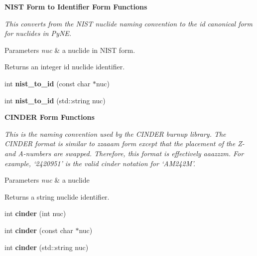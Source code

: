 \begin{Indent}{\bf N\+I\+ST Form to Identifier Form Functions}\par
{\em This converts from the N\+I\+ST nuclide naming convention to the id canonical form for nuclides in Py\+NE. 
\begin{DoxyParams}{Parameters}
{\em nuc} & a nuclide in N\+I\+ST form. \\
\hline
\end{DoxyParams}
\begin{DoxyReturn}{Returns}
an integer id nuclide identifier. 
\end{DoxyReturn}
}\begin{DoxyCompactItemize}
\item 
int {\bfseries nist\+\_\+to\+\_\+id} (const char $\ast$nuc)\hypertarget{namespacepyne_1_1nucname_a3b22d255aeb2eeef64f066747a75c1e7}{}\label{namespacepyne_1_1nucname_a3b22d255aeb2eeef64f066747a75c1e7}

\item 
int {\bfseries nist\+\_\+to\+\_\+id} (std\+::string nuc)\hypertarget{namespacepyne_1_1nucname_a7ef9fe9b42d5ac9063aab9a649e8dabd}{}\label{namespacepyne_1_1nucname_a7ef9fe9b42d5ac9063aab9a649e8dabd}

\end{DoxyCompactItemize}
\end{Indent}
\begin{Indent}{\bf C\+I\+N\+D\+ER Form Functions}\par
{\em This is the naming convention used by the C\+I\+N\+D\+ER burnup library. The C\+I\+N\+D\+ER format is similar to zzaaam form except that the placement of the Z-\/ and A-\/numbers are swapped. Therefore, this format is effectively aaazzzm. For example, ‘2420951’ is the valid cinder notation for ‘\+A\+M242\+M’. 
\begin{DoxyParams}{Parameters}
{\em nuc} & a nuclide \\
\hline
\end{DoxyParams}
\begin{DoxyReturn}{Returns}
a string nuclide identifier. 
\end{DoxyReturn}
}\begin{DoxyCompactItemize}
\item 
int {\bfseries cinder} (int nuc)\hypertarget{namespacepyne_1_1nucname_a72e7d4ad5fb78e4d0f63c3aa4acfbf52}{}\label{namespacepyne_1_1nucname_a72e7d4ad5fb78e4d0f63c3aa4acfbf52}

\item 
int {\bfseries cinder} (const char $\ast$nuc)\hypertarget{namespacepyne_1_1nucname_aa102e2c5853761ff39fb5f228b54e587}{}\label{namespacepyne_1_1nucname_aa102e2c5853761ff39fb5f228b54e587}

\item 
int {\bfseries cinder} (std\+::string nuc)\hypertarget{namespacepyne_1_1nucname_ade4d33508b97fd38dcca937e366f324e}{}\label{namespacepyne_1_1nucname_ade4d33508b97fd38dcca937e366f324e}

\end{DoxyCompactItemize}
\end{Indent}
